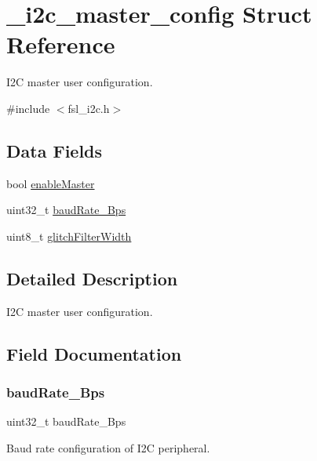 \hypertarget{struct__i2c__master__config}{}\section{\+\_\+i2c\+\_\+master\+\_\+config Struct Reference}
\label{struct__i2c__master__config}


I2C master user configuration.  




{\ttfamily \#include $<$fsl\+\_\+i2c.\+h$>$}

\subsection*{Data Fields}
\begin{DoxyCompactItemize}
\item 
bool \mbox{\hyperlink{struct__i2c__master__config_ab8b96ba3ced8b280ac1f366f6e76a9e7}{enable\+Master}}
\item 
uint32\+\_\+t \mbox{\hyperlink{struct__i2c__master__config_aa5df547b4cb95d3c959373cf6fa672b5}{baud\+Rate\+\_\+\+Bps}}
\item 
uint8\+\_\+t \mbox{\hyperlink{struct__i2c__master__config_a0ec674bca5cb7bb8a6c51a44a5fc4314}{glitch\+Filter\+Width}}
\end{DoxyCompactItemize}


\subsection{Detailed Description}
I2C master user configuration. 

\subsection{Field Documentation}
\mbox{\label{struct__i2c__master__config_aa5df547b4cb95d3c959373cf6fa672b5}} 
\subsubsection{\texorpdfstring{baudRate\_Bps}{baudRate\_Bps}}
{\footnotesize\ttfamily uint32\+\_\+t baud\+Rate\+\_\+\+Bps}

Baud rate configuration of I2C peripheral. \mbox{\label{struct__i2c__master__config_ab8b96ba3ced8b280ac1f366f6e76a9e7}} 
